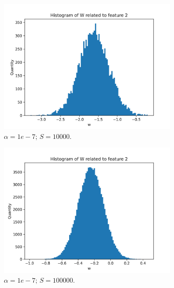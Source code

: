 \documentclass{article}
\begin{document}
\begin{figure}
\begin{subfigure}[t]{0.24\textwidth}
    \includegraphics[width=\linewidth]{hist_feat1_1_sample_10000.png}
    \caption{$\alpha = 1e-7$; $S = 10000$.}
  \end{subfigure}
  \hfill
  \begin{subfigure}[t]{0.24\textwidth}
    \centering
    \includegraphics[width=\linewidth]{hist_feat1_1_sample_100000.png}
    \caption{$\alpha = 1e-7$; $S = 100000$.}
  \end{subfigure}
  \begin{subfigure}[t]{0.24\textwidth}
    \centering

\end{subfigure}
\end{figure}
\end{document}
